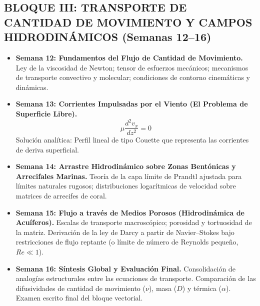 \subsection{BLOQUE III: TRANSPORTE DE CANTIDAD DE MOVIMIENTO Y CAMPOS HIDRODINÁMICOS (Semanas 12–16)}
\begin{itemize}
    \item \textbf{Semana 12: Fundamentos del Flujo de Cantidad de Movimiento.} Ley de la viscosidad de Newton;
tensor de esfuerzos mecánicos; mecanismos de transporte convectivo y molecular; condiciones de contorno cinemáticas y dinámicas.
\item \textbf{Semana 13: Corrientes Impulsadas por el Viento (El Problema de Superficie Libre).}
    \begin{equation*}
        \mu \frac{d^2 v_x}{dz^2} = 0
    \end{equation*}
Solución analítica: Perfil lineal de tipo Couette que representa las corrientes de deriva superficial.
    \item \textbf{Semana 14: Arrastre Hidrodinámico sobre Zonas Bentónicas y Arrecifales Marinas.} Teoría de la capa límite de Prandtl ajustada para límites naturales rugosos;
distribuciones logarítmicas de velocidad sobre matrices de arrecifes de coral.
    \item \textbf{Semana 15: Flujo a través de Medios Porosos (Hidrodinámica de Acuíferos).} Escalas de transporte macroscópico;
porosidad y tortuosidad de la matriz. Derivación de la ley de Darcy a partir de Navier--Stokes bajo restricciones de flujo reptante (o límite de número de Reynolds pequeño, $Re \ll 1$).
\item \textbf{Semana 16: Síntesis Global y Evaluación Final.} Consolidación de analogías estructurales entre las ecuaciones de transporte.
Comparación de las difusividades de cantidad de movimiento ($\nu$), masa ($D$) y térmica ($\alpha$). Examen escrito final del bloque vectorial.
\end{itemize}


